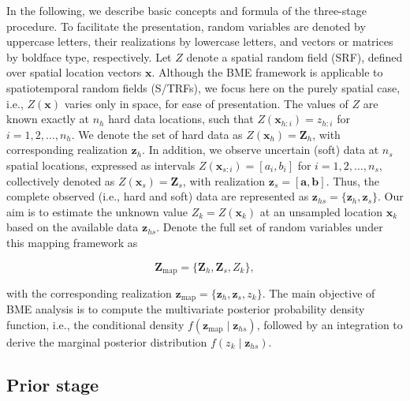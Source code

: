 In the following, we describe basic concepts and formula of the three-stage procedure. To facilitate the presentation, random variables are denoted by uppercase letters, their realizations by lowercase letters, and vectors or matrices by boldface type, respectively. Let \(Z\) denote a spatial random field (SRF), defined over spatial location vectors \(\boldsymbol{x}\). Although the BME framework is applicable to spatiotemporal random fields (S/TRFs), we focus here on the purely spatial case, i.e., \(Z(\boldsymbol{x})\) varies only in space, for ease of presentation. The values of \(Z\) are known exactly at \(n_h\) hard data locations, such that \(Z(\boldsymbol{x}_{h:i}) = z_{h:i}\) for \(i = 1, 2, \dots, n_h\). We denote the set of hard data as \(Z(\boldsymbol{x}_h) = \boldsymbol{Z}_h\), with corresponding realization \(\boldsymbol{z}_h\). In addition, we observe uncertain (soft) data at \(n_s\) spatial locations, expressed as intervals \(Z(\boldsymbol{x}_{s:i}) = [a_i, b_i]\) for \(i = 1, 2, \dots, n_s\), collectively denoted as \(Z(\boldsymbol{x}_s)=\boldsymbol{Z}_s\), with realization \(\boldsymbol{z}_s = [\boldsymbol{a}, \boldsymbol{b}]\). Thus, the complete observed (i.e., hard and soft) data are represented as \(\boldsymbol{z}_{hs} = \{ \boldsymbol{z}_h, \boldsymbol{z}_s \}\). Our aim is to estimate the unknown value \(Z_k = Z(\boldsymbol{x}_k)\) at an unsampled location \(\boldsymbol{x}_k\) based on the available data \(\boldsymbol{z}_{hs}\). Denote the full set of random variables under this mapping framework as

\begin{equation*}
\boldsymbol{Z}_\mathrm{map} = \{ \boldsymbol{Z}_h, \boldsymbol{Z}_s, Z_k \}, 
\end{equation*}

with the corresponding realization \(\boldsymbol{z}_\mathrm{map} = \{ \boldsymbol{z}_h, \boldsymbol{z}_s, z_k \}\). The main objective of BME analysis is to compute the multivariate posterior probability density function, i.e., the conditional density \(f(\boldsymbol{z}_\mathrm{map} \mid \boldsymbol{z}_{hs})\), followed by an integration to derive the marginal posterior distribution \(f(z_k\mid \boldsymbol{z}_{hs})\).

\subsection{Prior stage}\label{prior-stage}

